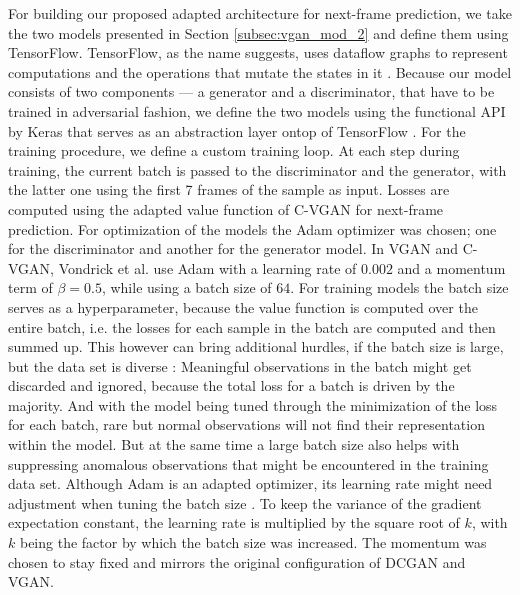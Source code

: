 For building our proposed adapted architecture for next-frame prediction, we take the two models presented in Section \ref{subsec:vgan_mod_2} and define them using TensorFlow. TensorFlow, as the name suggests, uses dataflow graphs to represent computations and the operations that mutate the states in it \cite{abadi2016tensorflow}. Because our model consists of two components --- a generator and a discriminator, that have to be trained in adversarial fashion, we define the two models using the functional API by Keras that serves as an abstraction layer ontop of TensorFlow \cite{chollet2015keras}. For the training procedure, we define a custom training loop. At each step during training, the current batch is passed to the discriminator and the generator, with the latter one using the first 7 frames of the sample as input. Losses are computed using the adapted value function of C-VGAN for next-frame prediction. For optimization of the models the Adam optimizer \cite{kingma2014adam} was chosen; one for the discriminator and another for the generator model. In VGAN and C-VGAN, Vondrick et al. use Adam with a learning rate of $0.002$ and a momentum term of $\beta = 0.5$, while using a batch size of $64$. For training models the batch size serves as a hyperparameter, because the value function is computed over the entire batch, i.e. the losses for each sample in the batch are computed and then summed up. This however can bring additional hurdles, if the batch size is large, but the data set is diverse \cite{radiuk2017impact}: Meaningful observations in the batch might get discarded and ignored, because the total loss for a batch is driven by the majority. And with the model being tuned through the minimization of the loss for each batch, rare but normal observations will not find their representation within the model. But at the same time a large batch size also helps with suppressing anomalous observations that might be encountered in the training data set. Although Adam is an adapted optimizer, its learning rate might need adjustment when tuning the batch size \cite{krizhevsky2014one}. To keep the variance of the gradient expectation constant, the learning rate is multiplied by the square root of $k$, with $k$ being the factor by which the batch size was increased. The momentum was chosen to stay fixed and mirrors the original configuration of DCGAN and VGAN.

